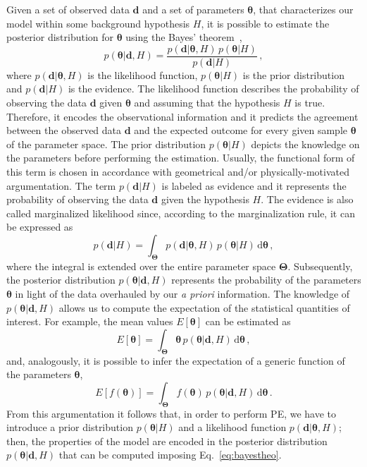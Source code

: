 \documentclass[prd,aps,twocolumn,a4paper,showkeys,nofootinbib,floatfix]{revtex4-1}
\newcommand{\be}{\begin{equation}}
\newcommand{\ee}{\end{equation}}
\def\params{\boldsymbol{\theta}}
\def\paramspace{\boldsymbol{\Theta}}
\def\data{\textbf{d}}
\def\d{\text{d}}
\begin{document}
Given a set of observed data $\data$
and a set of parameters $\params$, 
that characterizes our model within some background hypothesis $H$,
it is possible to estimate the posterior distribution for $\params$ using 
the Bayes' theorem~\cite{MacKay,gelmanbda04,Sivia2006},
\be
\label{eq:bayestheo}
p(\params|\data,H) = \frac{p(\data|\params,H) \, p(\params|H)}{p(\data|H)}\,,
\ee
where $p(\data|\params,H)$ is the likelihood function,
$p(\params|H)$ is the prior distribution 
and $p(\data|H)$ is the evidence.
The likelihood function describes 
the probability of observing the data $\data$ given $\params$ and assuming that the hypothesis $H$ is true.
Therefore, it encodes the observational information
and it predicts the agreement between the observed data $\data$ 
and the expected outcome for every given sample $\params$
of the parameter space.
The prior distribution $p(\params|H)$ depicts the knowledge on the 
parameters before performing the estimation. 
Usually, the functional form of this term is chosen in accordance with
geometrical and/or physically-motivated argumentation.
The term $p(\data|H)$ is 
labeled as evidence and it represents the probability 
of observing the data $\data$ given the hypothesis $H$.
The evidence is also called marginalized likelihood
since, according to the marginalization rule,
it can be expressed as
\be
\label{eq:evidence}
p(\data|H) = \int_{\paramspace} p(\data|\params,H) \, p(\params|H)\, \d\params \,,
\ee
where the integral is extended over the entire parameter space $\paramspace$.
Subsequently, the posterior distribution $p(\params|\data,H)$
represents the probability of the parameters $\params$ in light of the data
overhauled by our {\it a priori} information. 
The knowledge of $p(\params|\data,H)$ allows us 
to compute the expectation of the statistical quantities of interest.
For example, the mean values $E[\params]$ can be estimated as
\be
\label{eq:mean}
E[\params]= \int_{\paramspace} \params \, p(\params|\data,H) \, \d\params\,,
\ee
and, analogously, it is possible to infer the expectation of a generic function of the parameters $\params$,
\be
\label{eq:expect}
E\left[ f(\params) \right] = \int_{\paramspace} f(\params) \, p(\params|\data,H) \, \d\params\,.
\ee
From this argumentation it follows that,
in order to perform PE, we have to introduce a 
prior distribution $p(\params|H)$ 
and a likelihood function $p(\data|\params,H)$;
then, the properties of the model are encoded in the posterior 
distribution $p(\params|\data,H)$ that can be computed imposing Eq.~\eqref{eq:bayestheo}. 
\end{document}
